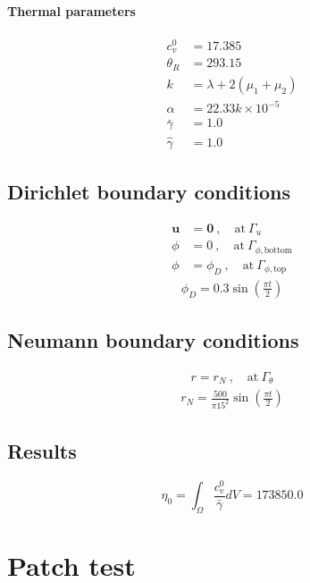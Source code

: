\documentclass[a4paper,12pt]{article}
\newcommand{\0}{\mathbf{0}}
\begin{document}
\paragraph{Thermal parameters}
\begin{align*}
c_v^0      &= 17.385  \\
\theta_R   &= 293.15  \\
k          &= \lambda + 2(\mu_1+\mu_2) \\
\alpha     &= 22.33k\times10^{-5} \\
\bar\gamma &= 1.0 \\
\hat\gamma &= 1.0
\end{align*}


\subsection{Dirichlet boundary conditions}

\begin{align*}
\mathbf{u} &= \mathbf{0} \ , \quad \text{at} \ \Gamma_{u} \\
\phi    &= 0 \ , \quad \text{at} \ \Gamma_{\phi,\text{bottom}} \\
\phi    &= \phi_D \ , \quad \text{at} \ \Gamma_{\phi,\text{top}}
\end{align*}
\begin{align*}
\phi_D = 0.3\sin\left(\frac{\pi t}{2}\right)
\end{align*}


\subsection{Neumann boundary conditions}

\begin{align*}
r = r_N \ , \quad \text{at} \ \Gamma_{\theta}
\end{align*}
\begin{align*}
r_N = \frac{500}{\pi 15^2}\sin\left(\frac{\pi t}{2}\right)
\end{align*}


\subsection{Results}

$$
\eta_0 = \int_\Omega\frac{c_v^0}{\bar\gamma}dV = 173850.0
$$




\section{Patch test}
\end{document}
